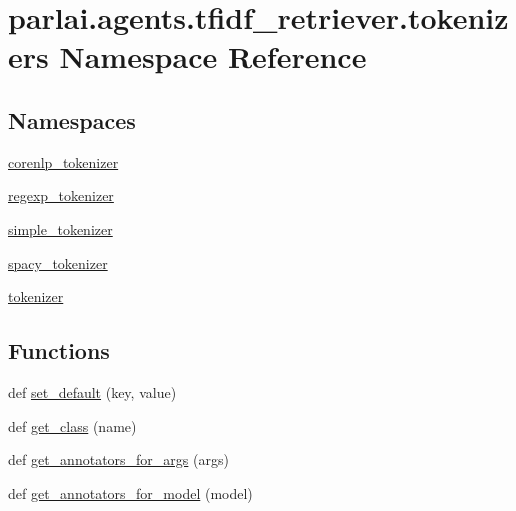 \hypertarget{namespaceparlai_1_1agents_1_1tfidf__retriever_1_1tokenizers}{}\section{parlai.\+agents.\+tfidf\+\_\+retriever.\+tokenizers Namespace Reference}
\label{namespaceparlai_1_1agents_1_1tfidf__retriever_1_1tokenizers}
\subsection*{Namespaces}
\begin{DoxyCompactItemize}
\item 
 \hyperlink{namespaceparlai_1_1agents_1_1tfidf__retriever_1_1tokenizers_1_1corenlp__tokenizer}{corenlp\+\_\+tokenizer}
\item 
 \hyperlink{namespaceparlai_1_1agents_1_1tfidf__retriever_1_1tokenizers_1_1regexp__tokenizer}{regexp\+\_\+tokenizer}
\item 
 \hyperlink{namespaceparlai_1_1agents_1_1tfidf__retriever_1_1tokenizers_1_1simple__tokenizer}{simple\+\_\+tokenizer}
\item 
 \hyperlink{namespaceparlai_1_1agents_1_1tfidf__retriever_1_1tokenizers_1_1spacy__tokenizer}{spacy\+\_\+tokenizer}
\item 
 \hyperlink{namespaceparlai_1_1agents_1_1tfidf__retriever_1_1tokenizers_1_1tokenizer}{tokenizer}
\end{DoxyCompactItemize}
\subsection*{Functions}
\begin{DoxyCompactItemize}
\item 
def \hyperlink{namespaceparlai_1_1agents_1_1tfidf__retriever_1_1tokenizers_aac1e43e3c08d0ea6279619797a56ba16}{set\+\_\+default} (key, value)
\item 
def \hyperlink{namespaceparlai_1_1agents_1_1tfidf__retriever_1_1tokenizers_a6e3556406937a237816d642d9e610a60}{get\+\_\+class} (name)
\item 
def \hyperlink{namespaceparlai_1_1agents_1_1tfidf__retriever_1_1tokenizers_abbf344e2c42997de73bbe499f86cdba7}{get\+\_\+annotators\+\_\+for\+\_\+args} (args)
\item 
def \hyperlink{namespaceparlai_1_1agents_1_1tfidf__retriever_1_1tokenizers_ab7667918dcbcaef77377c42adc16c2f6}{get\+\_\+annotators\+\_\+for\+\_\+model} (model)
\end{DoxyCompactItemize}
